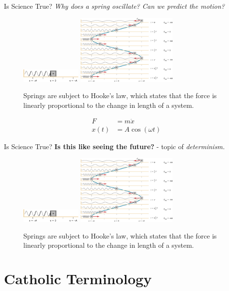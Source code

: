\documentclass{beamer}
\begin{document}
\begin{frame}{Is Science True?}
\textit{Why does a spring oscillate?  Can we predict the motion?}
\begin{figure}
\centering
\includegraphics[width=3cm]{figures/spring1.jpeg}
\includegraphics[width=5cm]{figures/spring2.jpeg}
\caption{Springs are subject to Hooke's law, which states that the force is linearly proportional to the change in length of a system.}
\end{figure}
\begin{align}
F &= m \ddot{x} \\
x(t) &= A \cos(\omega t)
\end{align}
\end{frame}

\begin{frame}{Is Science True?}
\textbf{Is this like seeing the future?} - topic of \textit{determinism.}
\begin{figure}
\centering
\includegraphics[width=3cm]{figures/spring1.jpeg}
\includegraphics[width=5cm]{figures/spring2.jpeg}
\caption{Springs are subject to Hooke's law, which states that the force is linearly proportional to the change in length of a system.}
\end{figure}
\end{frame}

\section{Catholic Terminology}
\end{document}
